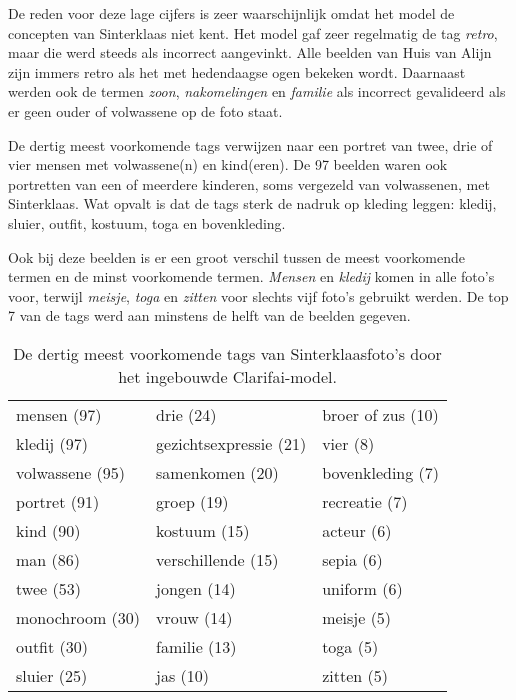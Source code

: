 De reden voor deze lage cijfers is zeer waarschijnlijk omdat het model de concepten van Sinterklaas niet kent. Het model gaf zeer regelmatig de tag \textit{retro}, maar die werd steeds als incorrect aangevinkt. Alle beelden van Huis van Alijn zijn immers retro als het met hedendaagse ogen bekeken wordt. Daarnaast werden ook de termen \textit{zoon}, \textit{nakomelingen} en \textit{familie} als incorrect gevalideerd als er geen ouder of volwassene op de foto staat. 

De dertig meest voorkomende tags verwijzen naar een portret van twee, drie of vier mensen met volwassene(n) en kind(eren). De 97 beelden waren ook portretten van een of meerdere kinderen, soms vergezeld van volwassenen, met Sinterklaas. Wat opvalt is dat de tags sterk de nadruk op kleding leggen: kledij, sluier, outfit, kostuum, toga en bovenkleding. 

Ook bij deze beelden is er een groot verschil tussen de meest voorkomende termen en de minst voorkomende termen. \textit{Mensen} en \textit{kledij} komen in alle foto’s voor, terwijl \textit{meisje}, \textit{toga} en \textit{zitten} voor slechts vijf foto’s gebruikt werden. De top 7 van de tags werd aan minstens de helft van de beelden gegeven. 

\begin{table}
	\centering
	\begin{tabular}{*{3}{l}}
		mensen (97) & drie (24) & broer of zus (10) \\
		kledij (97) & gezichtsexpressie (21) & vier (8) \\
		volwassene (95) & samenkomen (20) & bovenkleding (7) \\
		portret (91) & groep (19) & recreatie (7) \\
		kind (90) & kostuum (15) & acteur (6) \\
		man (86) & verschillende (15) & sepia (6) \\
		twee (53) & jongen (14) & uniform (6) \\
		monochroom (30) & vrouw (14) & meisje (5) \\
		outfit (30) & familie (13) & toga (5) \\
		sluier (25) & jas (10) & zitten (5) \\
	\end{tabular}
	\caption[Dertig meest voorkomende tags van Sinterklaasfoto's door het ingebouwde model]{De dertig meest voorkomende tags van Sinterklaasfoto's door het ingebouwde Clarifai-model.}
	\label{tab:30-termen-sint}
\end{table}


